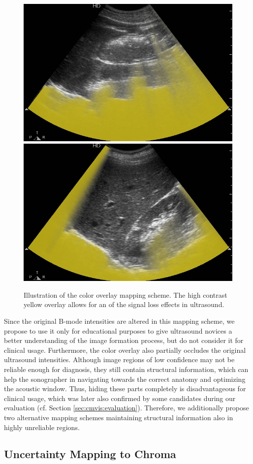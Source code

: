 \begin{figure}[ht]
	\centering
	\includegraphics[width=0.42\linewidth]{figures/cmvis/color-overlay-100.jpg}
	\qquad
	\includegraphics[width=0.42\linewidth]{figures/cmvis/color-overlay-300.jpg}
	\caption{
		Illustration of the color overlay mapping scheme.
		The high contrast yellow overlay allows for an  of the signal loss effects in ultrasound.
	}
	\label{fig:cmvis:vis-color-overlay}
\end{figure}

Since the original B-mode intensities are altered in this mapping scheme, we propose to use it only for educational purposes to give ultrasound novices a better understanding of the image formation process, but do not consider it for clinical usage.
Furthermore, the color overlay also partially occludes the original ultrasound intensities.
Although image regions of low confidence may not be reliable enough for diagnosis, they still contain structural information, which can help the sonographer in navigating towards the correct anatomy and optimizing the acoustic window. 
Thus, hiding these parts completely is disadvantageous for clinical usage, which was later also confirmed by some candidates during our evaluation (cf. Section \ref{sec:cmvis:evaluation}).
Therefore, we additionally propose two alternative mapping schemes maintaining structural information also in highly unreliable regions.



\subsection{Uncertainty Mapping to Chroma}
\label{sec:cmvis:mapping-to-chroma}

